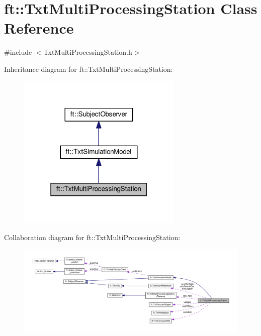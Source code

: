 \hypertarget{classft_1_1_txt_multi_processing_station}{}\section{ft\+:\+:Txt\+Multi\+Processing\+Station Class Reference}
\label{classft_1_1_txt_multi_processing_station}


{\ttfamily \#include $<$Txt\+Multi\+Processing\+Station.\+h$>$}



Inheritance diagram for ft\+:\+:Txt\+Multi\+Processing\+Station\+:
\nopagebreak
\begin{figure}[H]
\begin{center}
\leavevmode
\includegraphics[width=223pt]{classft_1_1_txt_multi_processing_station__inherit__graph}
\end{center}
\end{figure}


Collaboration diagram for ft\+:\+:Txt\+Multi\+Processing\+Station\+:
\nopagebreak
\begin{figure}[H]
\begin{center}
\leavevmode
\includegraphics[width=350pt]{classft_1_1_txt_multi_processing_station__coll__graph}
\end{center}
\end{figure}

